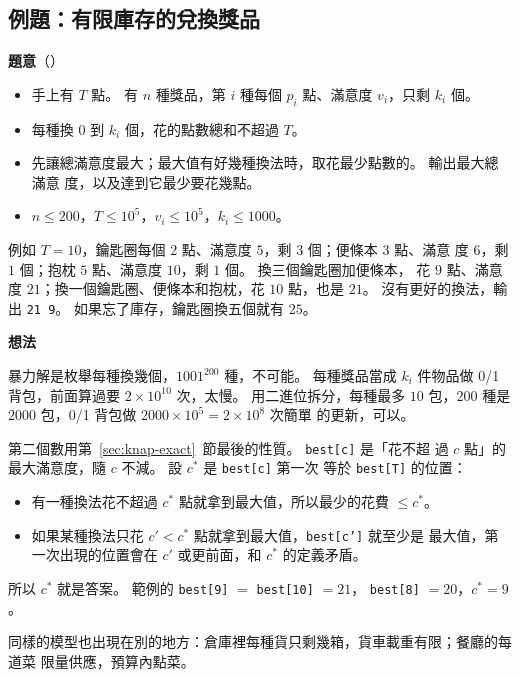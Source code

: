 \subsection{例題：有限庫存的兌換獎品}
\label{sec:ex-prizes}

\textbf{題意}（）

\begin{itemize}
\item 手上有 $T$ 點。 有 $n$ 種獎品，第 $i$ 種每個 $p_i$ 點、滿意度 $v_i$，只剩
$k_i$ 個。
\item 每種換 $0$ 到 $k_i$ 個，花的點數總和不超過 $T$。
\item 先讓總滿意度最大；最大值有好幾種換法時，取花最少點數的。 輸出最大總滿意
度，以及達到它最少要花幾點。
\item $n \le 200$，$T \le 10^5$，$v_i \le 10^5$，$k_i \le 1000$。
\end{itemize}

例如 $T = 10$，鑰匙圈每個 $2$ 點、滿意度 $5$，剩 $3$ 個；便條本 $3$ 點、滿意
度 $6$，剩 $1$ 個；抱枕 $5$ 點、滿意度 $10$，剩 $1$ 個。 換三個鑰匙圈加便條本，
花 $9$ 點、滿意度 $21$；換一個鑰匙圈、便條本和抱枕，花 $10$ 點，也是 $21$。
沒有更好的換法，輸出 \texttt{21 9}。 如果忘了庫存，鑰匙圈換五個就有 $25$。

\textbf{想法}

暴力解是枚舉每種換幾個，$1001^{200}$ 種，不可能。 每種獎品當成 $k_i$ 件物品做
0/1 背包，前面算過要 $2 \times 10^{10}$ 次，太慢。 用二進位拆分，每種最多 $10$
包，$200$ 種是 $2000$ 包，0/1 背包做 $2000 \times 10^5 = 2 \times 10^8$ 次簡單
的更新，可以。

第二個數用第~\ref{sec:knap-exact}~節最後的性質。 \texttt{best[c]} 是「花不超
過 $c$ 點」的最大滿意度，隨 $c$ 不減。 設 $c^*$ 是 \texttt{best[c]} 第一次
等於 \texttt{best[T]} 的位置：

\begin{itemize}
\item 有一種換法花不超過 $c^*$ 點就拿到最大值，所以最少的花費 $\le c^*$。
\item 如果某種換法只花 $c' < c^*$ 點就拿到最大值，\texttt{best[c']} 就至少是
最大值，第一次出現的位置會在 $c'$ 或更前面，和 $c^*$ 的定義矛盾。
\end{itemize}

所以 $c^*$ 就是答案。 範例的 \texttt{best[9]} $=$ \texttt{best[10]} $= 21$，
\texttt{best[8]} $= 20$，$c^* = 9$。

同樣的模型也出現在別的地方：倉庫裡每種貨只剩幾箱，貨車載重有限；餐廳的每道菜
限量供應，預算內點菜。

